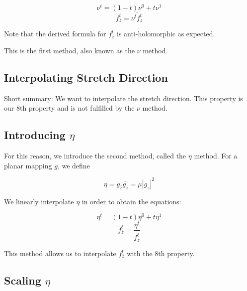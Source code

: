 $$\nu^t = (1-t) \nu^0 + t \nu^1$$
$$f_{\overline{z}}^t = \overline{\nu^t f_z^t}$$

Note that the derived formula for $f_{\overline{z}}^t$ is anti-holomorphic as expected.

This is the first method, also known as the $\nu$ method.

\subsection{Interpolating Stretch Direction}

Short summary: We want to interpolate the stretch direction. This property is our 8th property and is not fulfilled by the $\nu$ method.

\subsection{Introducing $\eta$}

For this reason, we introduce the second method, called the $\eta$ method. For a planar mapping $g$, we define 

$$ \eta = g_{\overline{z}} \overline{g_z} = \mu |g_z|^2 $$

We linearly interpolate $\eta$ in order to obtain the equations:

$$\eta^t = (1-t) \eta^0 + t \eta^1$$
$$f_{\overline{z}}^t = \frac{\eta^t}{ \overline{f_z^t} }$$

This method allows us to interpolate $f_{\overline{z}}^t$ with the 8th property. 




\subsection{Scaling $\eta$}


